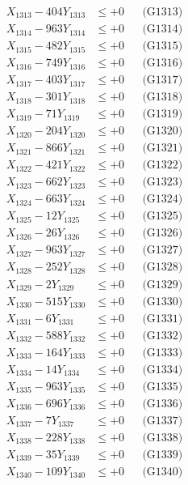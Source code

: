 \documentclass[a4paper,10pt]{article}
\begin{document}
{\begin{align}
X_{1313} - 404Y_{1313} &\leq +0 && \text{(G1313)} \\
X_{1314} - 963Y_{1314} &\leq +0 && \text{(G1314)} \\
X_{1315} - 482Y_{1315} &\leq +0 && \text{(G1315)} \\
X_{1316} - 749Y_{1316} &\leq +0 && \text{(G1316)} \\
X_{1317} - 403Y_{1317} &\leq +0 && \text{(G1317)} \\
X_{1318} - 301Y_{1318} &\leq +0 && \text{(G1318)} \\
X_{1319} - 71Y_{1319} &\leq +0 && \text{(G1319)} \\
X_{1320} - 204Y_{1320} &\leq +0 && \text{(G1320)} \\
\allowbreak
X_{1321} - 866Y_{1321} &\leq +0 && \text{(G1321)} \\
X_{1322} - 421Y_{1322} &\leq +0 && \text{(G1322)} \\
X_{1323} - 662Y_{1323} &\leq +0 && \text{(G1323)} \\
X_{1324} - 663Y_{1324} &\leq +0 && \text{(G1324)} \\
X_{1325} - 12Y_{1325} &\leq +0 && \text{(G1325)} \\
X_{1326} - 26Y_{1326} &\leq +0 && \text{(G1326)} \\
X_{1327} - 963Y_{1327} &\leq +0 && \text{(G1327)} \\
X_{1328} - 252Y_{1328} &\leq +0 && \text{(G1328)} \\
X_{1329} - 2Y_{1329} &\leq +0 && \text{(G1329)} \\
X_{1330} - 515Y_{1330} &\leq +0 && \text{(G1330)} \\
\allowbreak
X_{1331} - 6Y_{1331} &\leq +0 && \text{(G1331)} \\
X_{1332} - 588Y_{1332} &\leq +0 && \text{(G1332)} \\
X_{1333} - 164Y_{1333} &\leq +0 && \text{(G1333)} \\
X_{1334} - 14Y_{1334} &\leq +0 && \text{(G1334)} \\
X_{1335} - 963Y_{1335} &\leq +0 && \text{(G1335)} \\
X_{1336} - 696Y_{1336} &\leq +0 && \text{(G1336)} \\
X_{1337} - 7Y_{1337} &\leq +0 && \text{(G1337)} \\
X_{1338} - 228Y_{1338} &\leq +0 && \text{(G1338)} \\
X_{1339} - 35Y_{1339} &\leq +0 && \text{(G1339)} \\
X_{1340} - 109Y_{1340} &\leq +0 && \text{(G1340)} \\

\end{align}}
\end{document}
